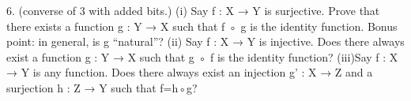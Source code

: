 

6. (converse of 3 with added bits.)
(i) Say f : X → Y is surjective. Prove that there exists a function g : Y → X such that f ◦ g
is the identity function. Bonus point: in general, is g “natural”?
(ii) Say f : X → Y is injective. Does there always exist a function g : Y → X such that g ◦ f
is the identity function?
(iii)Say f : X → Y is any function. Does there always exist an injection g' : X → Z and a surjection h : Z → Y such that f=h◦g?
